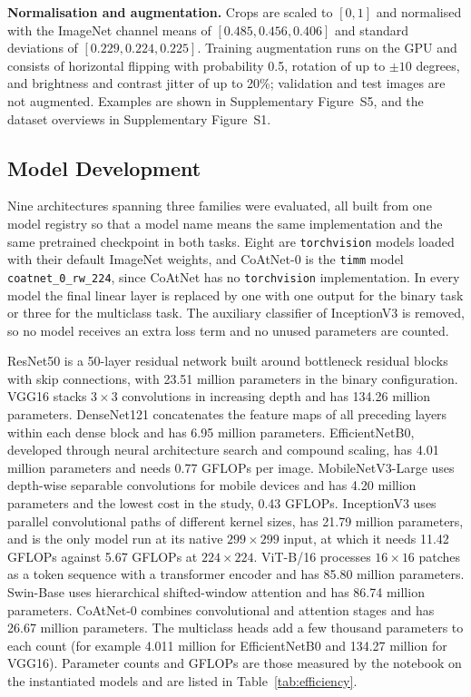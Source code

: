 \documentclass[final,3p,times,number]{elsarticle}
\begin{document}
\textbf{Normalisation and augmentation.} Crops are scaled to $[0,1]$ and normalised with the ImageNet channel means of $[0.485, 0.456, 0.406]$ and standard deviations of $[0.229, 0.224, 0.225]$. Training augmentation runs on the GPU and consists of horizontal flipping with probability 0.5, rotation of up to $\pm 10$ degrees, and brightness and contrast jitter of up to 20\%; validation and test images are not augmented. Examples are shown in Supplementary Figure~S5, and the dataset overviews in Supplementary Figure~S1.

\subsection{Model Development}
\label{sec:models}

Nine architectures spanning three families were evaluated, all built from one model registry so that a model name means the same implementation and the same pretrained checkpoint in both tasks. Eight are \texttt{torchvision} models loaded with their default ImageNet weights, and CoAtNet-0 is the \texttt{timm} model \texttt{coatnet\_0\_rw\_224}, since CoAtNet has no \texttt{torchvision} implementation. In every model the final linear layer is replaced by one with one output for the binary task or three for the multiclass task. The auxiliary classifier of InceptionV3 is removed, so no model receives an extra loss term and no unused parameters are counted.

ResNet50 is a 50-layer residual network built around bottleneck residual blocks with skip connections, with 23.51 million parameters in the binary configuration. VGG16 stacks $3\times 3$ convolutions in increasing depth and has 134.26 million parameters. DenseNet121 concatenates the feature maps of all preceding layers within each dense block and has 6.95 million parameters. EfficientNetB0, developed through neural architecture search and compound scaling, has 4.01 million parameters and needs 0.77 GFLOPs per image. MobileNetV3-Large uses depth-wise separable convolutions for mobile devices and has 4.20 million parameters and the lowest cost in the study, 0.43 GFLOPs. InceptionV3 uses parallel convolutional paths of different kernel sizes, has 21.79 million parameters, and is the only model run at its native $299\times 299$ input, at which it needs 11.42 GFLOPs against 5.67 GFLOPs at $224\times 224$. ViT-B/16 processes $16\times 16$ patches as a token sequence with a transformer encoder and has 85.80 million parameters. Swin-Base uses hierarchical shifted-window attention and has 86.74 million parameters. CoAtNet-0 combines convolutional and attention stages and has 26.67 million parameters. The multiclass heads add a few thousand parameters to each count (for example 4.011 million for EfficientNetB0 and 134.27 million for VGG16). Parameter counts and GFLOPs are those measured by the notebook on the instantiated models and are listed in Table~\ref{tab:efficiency}.
\end{document}
